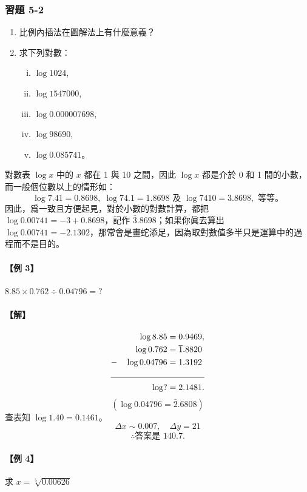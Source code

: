 \subsubsection*{習題 5-2}
\begin{enumerate}
    \item 比例內插法在圖解法上有什麼意義？
    \item 求下列對數：
    \begin{enumerate}[(i)]
        \item $\log 1024$,
        \item $\log 1547000$,
        \item $\log 0.000007698$,
        \item $\log 98690$,
        \item $\log 0.085741$。
    \end{enumerate}
\end{enumerate}

對數表 $\log x$ 中的 $x$ 都在 1 與 10 之間，因此 $\log x$ 都是介於 0 和 1 間的小數，而一般個位數以上的情形如：
\[
\log 7.41 = 0.8698, \; \log 74.1 = 1.8698 \text{ 及 } \log 7410 = 3.8698, \text{ 等等。}
\]
因此，爲一致且方便起見，對於小數的對數計算，都把 $\log 0.00741 = -3 + 0.8698$，記作 $\bar{3}.8698$；如果你眞去算出 $\log 0.00741 = -2.1302$，那常會是畫蛇添足，因為取對數值多半只是運算中的過程而不是目的。

\paragraph{【例 3】} $8.85 \times 0.762 \div 0.04796 = ?$

\paragraph{【解】}\label{note:b2-ch5-p116-ex3-minus-log}
\begin{align*}
\log 8.85 &= 0.9469, \\
\log 0.762 &= \bar{1}.8820 \\
-\quad \log 0.04796 &= 1.3192 \\
\cline{1-2}
\log ? &= 2.1481.
\end{align*}
\[
(\log 0.04796 = \bar{2}.6808)
\]
查表知 $\log 1.40 = 0.1461$。
\[
\Delta x \sim 0.007, \quad \Delta y = 21
\]
\[
\therefore \text{答案是 } 140.7.
\]

\paragraph{【例 4】} 求 $x = \sqrt[5]{0.00626}$

